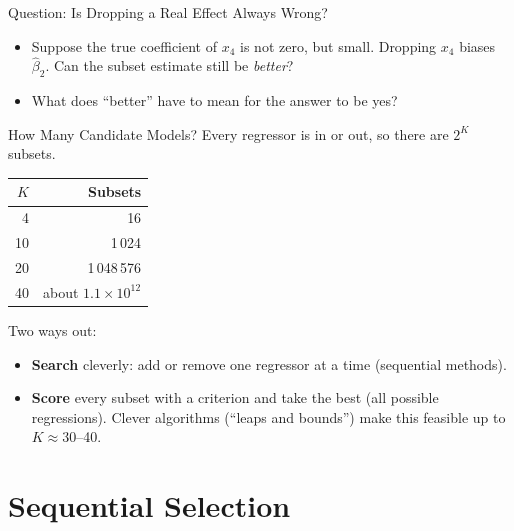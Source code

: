\begin{frame}{Question: Is Dropping a Real Effect Always Wrong?}
    \begin{itemize}
        \item Suppose the true coefficient of $x_4$ is not zero, but small. Dropping $x_4$ biases $\hat{\beta}_2$. Can the subset estimate still be \emph{better}?
        \item What does ``better'' have to mean for the answer to be yes?
    \end{itemize}
\end{frame}


\begin{frame}{How Many Candidate Models?}
    Every regressor is in or out, so there are $2^K$ subsets.
    \begin{center}
        \small
        \begin{tabular}{rr}
            \toprule
            $K$ & Subsets \\
            \midrule
            4 & 16 \\
            10 & 1\,024 \\
            20 & 1\,048\,576 \\
            40 & about $1.1\times10^{12}$ \\
            \bottomrule
        \end{tabular}
    \end{center}
    Two ways out:
    \begin{itemize}
        \item \textbf{Search} cleverly: add or remove one regressor at a time (sequential methods).
        \item \textbf{Score} every subset with a criterion and take the best (all possible regressions). Clever algorithms (``leaps and bounds'') make this feasible up to $K\approx30$--40.
    \end{itemize}
\end{frame}


\section{Sequential Selection}


